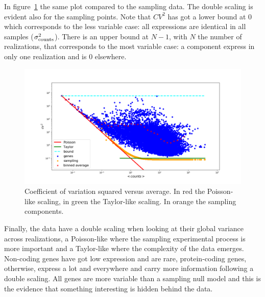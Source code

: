 In figure~\ref{fig:scalinglaws/gtex/cvmean_loglog_sampling} the same plot compared to the sampling data. The double scaling is evident also for the sampling points. Note that $CV^2$ has got a lower bound at $0$ which corresponds to the less variable case: all expressions are identical in all samples ($\sigma^2_{\mathrm{counts}}$). There is an upper bound at $N-1$, with $N$ the number of realizations, that corresponds to the most variable case: a component express in only one realization and is $0$ elsewhere.
\begin{figure}[htb!]
    \centering
    \includegraphics[width=0.9\linewidth]{pictures/scalinglaws/gtex/cvmean_loglog_sampling.png}
    \caption{Coefficient of variation squared versus average. In \textcolor{pythonred}{red} the Poisson-like scaling, in \textcolor{pythongreen}{green} the Taylor-like scaling. In \textcolor{pythonorange}{orange} the sampling components.}
    \label{fig:scalinglaws/gtex/cvmean_loglog_sampling}
\end{figure}

Finally, the data have a double scaling when looking at their global variance across realizations, a Poisson-like where the sampling experimental process is more important and a Taylor-like where the complexity of the data emerges.
Non-coding genes have got low expression and are rare, protein-coding genes, otherwise, express a lot and everywhere and carry more information following a double scaling. All genes are more variable than a sampling null model and this is the evidence that something interesting is hidden behind the data.
